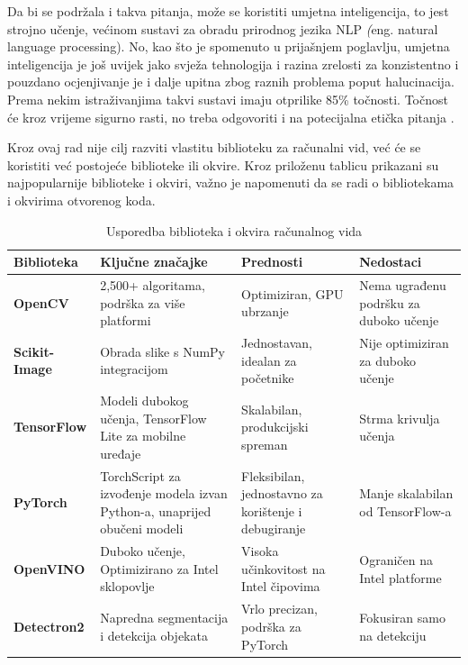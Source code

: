 \documentclass{foi}
\begin{document}
Da bi se podržala i takva pitanja, može se koristiti umjetna inteligencija, to jest strojno učenje, većinom sustavi za obradu prirodnog jezika NLP \textit({eng. natural language processing}). No, kao što je spomenuto u prijašnjem poglavlju, umjetna inteligencija je još uvijek jako svježa tehnologija i razina zrelosti za konzistentno i pouzdano ocjenjivanje je i dalje upitna zbog raznih problema poput halucinacija. Prema nekim istraživanjima takvi sustavi imaju otprilike 85\% točnosti. Točnost će kroz vrijeme sigurno rasti, no treba odgovoriti i na potecijalna etička pitanja \cite{OMRNLP}.

Kroz ovaj rad nije cilj razviti vlastitu biblioteku za računalni vid, već će se koristiti već postojeće biblioteke ili okvire. Kroz priloženu tablicu prikazani su najpopularnije biblioteke i okviri, važno je napomenuti da se radi o bibliotekama i okvirima otvorenog koda.

\begin{table}[htbp]
\centering
\renewcommand{\arraystretch}{1.3}
\begin{tabularx}{\textwidth}{|l|X|X|X|}
\hline
\textbf{Biblioteka} & \textbf{Ključne značajke} & \textbf{Prednosti} & \textbf{Nedostaci} \\
\hline
\textbf{OpenCV} & 2,500+ algoritama, podrška za više platformi & Optimiziran, GPU ubrzanje & Nema ugrađenu podršku za duboko učenje \\
\hline
\textbf{Scikit-Image} & Obrada slike s NumPy integracijom & Jednostavan, idealan za početnike & Nije optimiziran za duboko učenje  \\
\hline
\textbf{TensorFlow} & Modeli dubokog učenja, TensorFlow Lite za mobilne uređaje & Skalabilan, produkcijski spreman & Strma krivulja učenja \\
\hline
\textbf{PyTorch} & TorchScript za izvođenje modela izvan Python-a, unaprijed obučeni modeli & Fleksibilan, jednostavno za korištenje i debugiranje & Manje skalabilan od TensorFlow-a\\
\hline
\textbf{OpenVINO} & Duboko učenje, Optimizirano za Intel sklopovlje & Visoka učinkovitost na Intel čipovima & Ograničen na Intel platforme \\
\hline
\textbf{Detectron2} & Napredna segmentacija i detekcija objekata & Vrlo precizan, podrška za PyTorch & Fokusiran samo na detekciju \\
\hline
\end{tabularx}
\caption{Usporedba biblioteka i okvira računalnog vida \cite{Saiwa2024Nov}}
\label{tab:computer_vision_languages}
\end{table}
\end{document}

